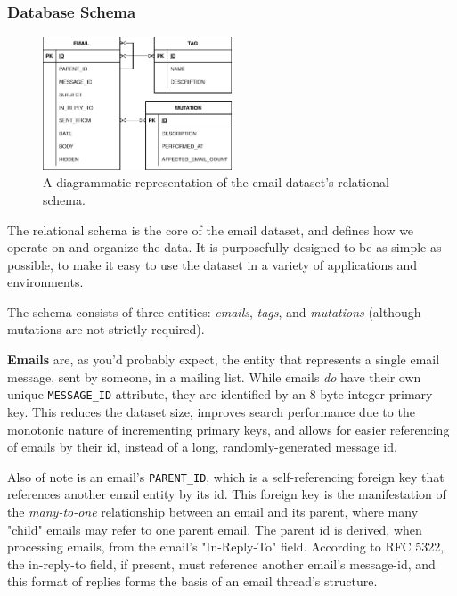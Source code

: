 \documentclass[a4paper, 12pt]{article}
\begin{document}
		\subsubsection{Database Schema}
			\begin{figure}
				\label{fig:schema}
				\includegraphics[width=0.5\textwidth]{img/simple_schema.png}
				\caption{A diagrammatic representation of the email dataset's relational schema.}
			\end{figure}
			The relational schema is the core of the email dataset, and defines how we operate on and organize the data. It is purposefully designed to be as simple as possible, to make it easy to use the dataset in a variety of applications and environments.
			
			The schema consists of three entities: \textit{emails}, \textit{tags}, and \textit{mutations} (although mutations are not strictly required).
			
			\textbf{Emails} are, as you'd probably expect, the entity that represents a single email message, sent by someone, in a mailing list. While emails \textit{do} have their own unique \texttt{MESSAGE\_ID} attribute\cite{rfc5322}, they are identified by an 8-byte integer primary key. This reduces the dataset size, improves search performance due to the monotonic nature of incrementing primary keys, and allows for easier referencing of emails by their id, instead of a long, randomly-generated message id.
			
			Also of note is an email's \texttt{PARENT\_ID}, which is a self-referencing foreign key that references another email entity by its id. This foreign key is the manifestation of the \textit{many-to-one} relationship between an email and its parent, where many "child" emails may refer to one parent email. The parent id is derived, when processing emails, from the email's "In-Reply-To" field. According to RFC 5322, the in-reply-to field, if present, must reference another email's message-id, and this format of replies forms the basis of an email thread's structure\cite{rfc5322}.
			
\end{document}
